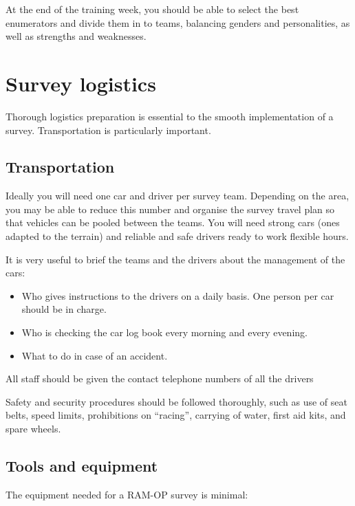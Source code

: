 \documentclass[12pt,a4paper]{book}
\providecommand{\tightlist}{%
  \setlength{\itemsep}{0pt}\setlength{\parskip}{0pt}}
\theoremstyle{definition}
\theoremstyle{definition}
\theoremstyle{definition}
\theoremstyle{remark}
\begin{document}
At the end of the training week, you should be able to select the best
enumerators and divide them in to teams, balancing genders and
personalities, as well as strengths and weaknesses.

\hypertarget{survey-logistics}{%
\section{Survey logistics}\label{survey-logistics}}

Thorough logistics preparation is essential to the smooth implementation
of a survey. Transportation is particularly important.

\hypertarget{transportation}{%
\subsection{Transportation}\label{transportation}}

Ideally you will need one car and driver per survey team. Depending on
the area, you may be able to reduce this number and organise the survey
travel plan so that vehicles can be pooled between the teams. You will
need strong cars (ones adapted to the terrain) and reliable and safe
drivers ready to work flexible hours.

It is very useful to brief the teams and the drivers about the
management of the cars:

\begin{itemize}
\tightlist
\item
  Who gives instructions to the drivers on a daily basis. One person per
  car should be in charge.
\item
  Who is checking the car log book every morning and every evening.
\item
  What to do in case of an accident.
\end{itemize}

All staff should be given the contact telephone numbers of all the
drivers

Safety and security procedures should be followed thoroughly, such as
use of seat belts, speed limits, prohibitions on ``racing'', carrying of
water, first aid kits, and spare wheels.

\hypertarget{tools-and-equipment}{%
\subsection{Tools and equipment}\label{tools-and-equipment}}

The equipment needed for a RAM-OP survey is minimal:
\end{document}
